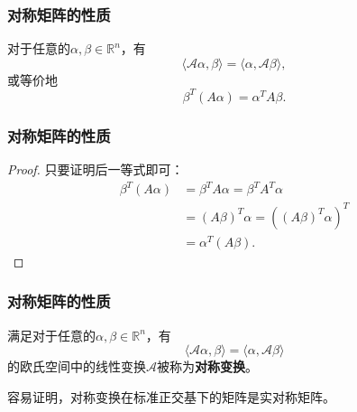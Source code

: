 
\begin{frame}
\frametitle{对称矩阵的性质}

\begin{lem}
对于任意的$\alpha, \beta \in \mathbb{R}^n$，有
$$\langle \mathscr{A}\alpha, \beta \rangle = \langle \alpha, \mathscr{A}\beta \rangle,$$
或等价地
$$\beta^T (A\alpha) = \alpha^T A \beta.$$
\end{lem}

\end{frame}


\begin{frame}
\frametitle{对称矩阵的性质}

\begin{proof}
只要证明后一等式即可：
\begin{align*}
    \beta^T (A\alpha) & = \beta^T A \alpha = \beta^T A^T \alpha \\
    & = (A\beta)^T \alpha = \left( (A\beta)^T \alpha \right)^T \\
    & = \alpha^T (A\beta).
\end{align*}
\end{proof}

\end{frame}


\begin{frame}
\frametitle{对称矩阵的性质}

\begin{Def}
满足对于任意的$\alpha, \beta \in \mathbb{R}^n$，有
$$\langle \mathscr{A}\alpha, \beta \rangle = \langle \alpha, \mathscr{A}\beta \rangle$$
的欧氏空间中的线性变换$\mathscr{A}$被称为{\bfseries 对称变换}。
\end{Def}

\pause
\vspace{2em}

容易证明，对称变换在标准正交基下的矩阵是实对称矩阵。

\end{frame}


